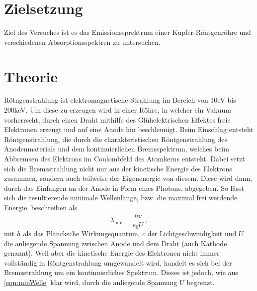 \section{Zielsetzung}
Ziel des Versuches ist es das Emissionssprektrum einer Kupfer-Röntgenröhre und verschiedenen Absorptionsspektren zu untersuchen.

\section{Theorie}
Rötngenstrahlung ist elektromagnetische Strahlung im Bereich von 10eV bis 200keV. Um diese zu erzeugen wird in einer Röhre, in welcher ein Vakuum vorherrscht, durch einen Draht mithilfe des Glühelektrischen Effektes freie Elektronen erzeugt und 
auf eine Anode hin beschleunigt. Beim Einschlag entsteht Röntgenstrahlung, die durch die charakteristischen Röntgenstrahlung des Anodenmaterials und dem kontinuierlichen Bremsspektrum, 
welches beim Abbremsen des Elektrons im Coulombfeld des Atomkerns entsteht. 
Dabei setzt sich die Bremsstrahlung nicht nur aus der kinetische Energie des Elektrons zusammen, sondern auch teilweise der Eigenenergie von diesem. Diese wird dann, durch das Einfangen an der Anode in Form 
eines Photons, abgegeben. So lässt sich die resultierende minimale Wellenlänge, bzw. die maximal frei werdende Energie, beschreiben als
\begin{equation}
    \lambda_\text{min} = \frac{h c}{e_0 U} \, ,
    \label{eqn:minWelle}
\end{equation}
\noindent
mit $h$ als das Plancksche Wirkungsquantum, $c$ der Lichtgeschwindigkeit und $U$ die anliegende Spannung zwischen Anode und dem Draht (auch Kathode genannt). Weil aber die 
kinetische Energie des Elektronen nicht immer vollständig in Röntgenstrahlung umgewandelt wird, handelt es sich bei der Bremsstrahlung um ein kontinuierliches Spektrum. Dieses ist jedoch, 
wie aus \autoref{eqn:minWelle} klar wird, durch die anliegende Spannung $U$ begrenzt.

